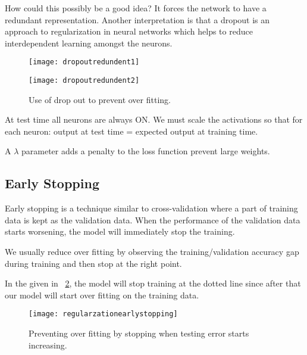 How could this possibly be a good idea?  It forces the network to have a redundant representation.  Another interpretation is that a dropout is an approach to regularization in neural networks which helps to reduce interdependent learning amongst the neurons.

	\begin{figure}[tbp]
		\begin{minipage}[t]{0.475\textwidth}
			\centering
			\texttt{[image: dropoutredundent1]}
			\label{fig:dropoutredundent1}
		\end{minipage}
		\hfill
		\begin{minipage}[t]{0.475\textwidth}
			\centering
			\texttt{[image: dropoutredundent2]}
			\label{fig:dropoutredundent2}
		\end{minipage}
		\caption[Use of drop out to prevent over fitting]{Use of drop out to prevent over fitting.}
	\end{figure}

At test time all neurons are always ON.  We must scale the activations so that for each neuron: output at test time = expected output at training time.

A $\lambda$ parameter adds a penalty to the loss function prevent large weights.

	\subsection{Early Stopping}
	\begin{bulletedlist}
		\item Early stopping is a technique similar to cross-validation where a part of training data is kept as the validation data. When the performance of the validation data starts worsening, the model will immediately stop the training.
		\item We usually reduce over fitting by observing the training/validation accuracy gap during training and then stop at the right point.
		\item In the given in \figurename~\ref{fig:regularzationearlystopping}, the model will stop training at the dotted line since after that our model will start over fitting on the training data.
	\end{bulletedlist}

 	\begin{figure}[htb]
		\centering
		\texttt{[image: regularzationearlystopping]}
		\caption[Preventing over fitting by stopping when testing error starts increasing]{Preventing over fitting by stopping when testing error starts increasing.}
		\label{fig:regularzationearlystopping}
	\end{figure}

